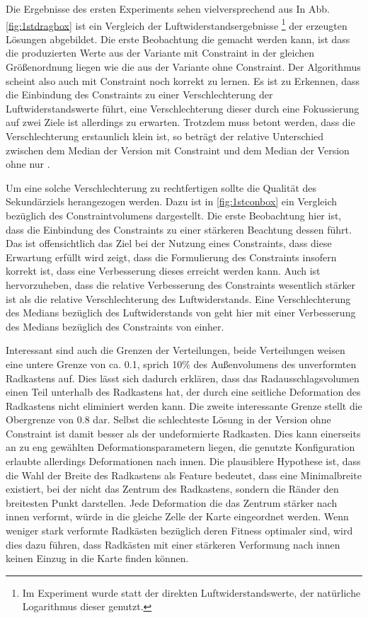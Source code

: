 Die Ergebnisse des ersten Experiments sehen vielversprechend aus In Abb. \cref{fig:1stdragbox} ist ein Vergleich der Luftwiderstandsergebnisse 
\footnote{Im Experiment wurde statt der direkten Luftwiderstandswerte, der natürliche Logarithmus dieser genutzt.} 
der erzeugten Lösungen abgebildet.
Die erste Beobachtung die gemacht werden kann, ist dass die produzierten Werte aus der Variante mit Constraint in der gleichen Größenordnung liegen wie die aus der Variante ohne Constraint.
Der Algorithmus scheint also auch mit Constraint noch korrekt zu lernen.
Es ist zu Erkennen, dass die Einbindung des Constraints zu einer Verschlechterung der Luftwiderstandswerte führt, eine Verschlechterung dieser durch eine Fokussierung auf zwei Ziele ist allerdings zu erwarten.
Trotzdem muss betont werden, dass die Verschlechterung erstaunlich klein ist, so beträgt der relative Unterschied zwischen dem Median der Version mit Constraint und dem Median der Version ohne nur .

Um eine solche Verschlechterung zu rechtfertigen sollte die Qualität des Sekundärziels herangezogen werden.
Dazu ist in \cref{fig:1stconbox} ein Vergleich bezüglich des Constraintvolumens dargestellt.
Die erste Beobachtung hier ist, dass die Einbindung des Constraints zu einer stärkeren Beachtung dessen führt.
Das ist offensichtlich das Ziel bei der Nutzung eines Constraints, dass diese Erwartung erfüllt wird zeigt, dass die Formulierung des Constraints insofern korrekt ist, dass eine Verbesserung dieses erreicht werden kann.
Auch ist hervorzuheben, dass die relative Verbesserung des Constraints wesentlich stärker ist als die relative Verschlechterung des Luftwiderstands.
Eine Verschlechterung des Medians bezüglich des Luftwiderstands von  geht hier mit einer Verbesserung des Medians bezüglich des Constraints von  einher.

Interessant sind auch die Grenzen der Verteilungen, beide Verteilungen weisen eine untere Grenze von ca. 0.1, sprich 10\% des Außenvolumens des unverformten Radkastens auf.
Dies lässt sich dadurch erklären, dass das Radausschlagsvolumen einen Teil unterhalb des Radkastens hat, der durch eine seitliche Deformation des Radkastens nicht eliminiert werden kann.
Die zweite interessante Grenze stellt die Obergrenze von 0.8 dar.
Selbst die schlechteste Lösung in der Version ohne Constraint ist damit besser als der undeformierte Radkasten.
Dies kann einerseits an zu eng gewählten Deformationsparametern liegen, die genutzte Konfiguration erlaubte allerdings Deformationen nach innen.
Die plausiblere Hypothese ist, dass die Wahl der Breite des Radkastens als Feature bedeutet, dass eine Minimalbreite existiert, bei der nicht das Zentrum des Radkastens, sondern die Ränder den breitesten Punkt darstellen.
Jede Deformation die das Zentrum stärker nach innen verformt, würde in die gleiche Zelle der Karte eingeordnet werden.
Wenn weniger stark verformte Radkästen bezüglich deren Fitness optimaler sind, wird dies dazu führen, dass Radkästen mit einer stärkeren Verformung nach innen keinen Einzug in die Karte finden können.

